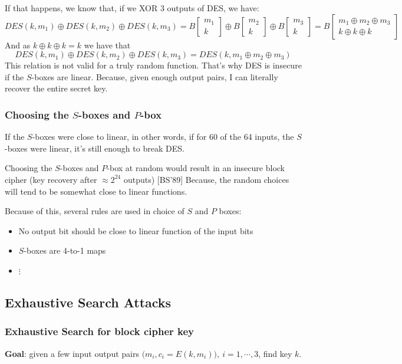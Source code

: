 \documentclass[12pt]{book}
\begin{document}
If that happens, we know that, if we XOR 3 outputs of DES, we have:
$$DES(k,m_{1})\oplus DES(k,m_{2})\oplus DES(k,m_{3})=B\left[\begin{array}{c}
	m_{1}\\
	k
\end{array}\right]\oplus B\left[\begin{array}{c}
	m_{2}\\
	k
\end{array}\right]\oplus B\left[\begin{array}{c}
	m_{3}\\
	k
\end{array}\right]=B\left[\begin{array}{c}
	m_{1}\oplus m_{2}\oplus m_{3}\\
	k\oplus k\oplus k
\end{array}\right]$$And as $k\oplus k\oplus k=k$ we have that
$$DES(k,m_{1})\oplus DES(k,m_{2})\oplus DES(k,m_{3})=DES(k,m_{1}\oplus m_{2}\oplus m_{3})$$This relation is not valid for a truly random function. That's why DES is insecure if the $S$-boxes are linear. Because, given enough output pairs, I can literally recover the entire secret key.

\subsubsection{Choosing the $S$-boxes and $P$-box}
If the $S$-boxes were close to linear, in other words, if for 60 of the 64 inputs, the $S$-boxes were linear, it's still enough to break DES.

Choosing the $S$-boxes and $P$-box at random would result in an insecure block cipher (key recovery after $\approx2^{24}$ outputs) [BS'89] Because, the random choices will tend to be somewhat close to linear functions.

Because of this, several rules are used in choice of $S$ and $P$ boxes:
\begin{itemize}
	\item No output bit should be close to linear function of the input bits
	\item $S$-boxes are 4-to-1 maps
	\item[] $\vdots$
\end{itemize}

\subsection{Exhaustive Search Attacks}
\subsubsection{Exhaustive Search for block cipher key}
\textbf{Goal}: given a few input output pairs $\big(m_{i},c_{i}=E(k,m_{i})\big),\ i=1,\cdots,3$, find key $k$.
\end{document}
